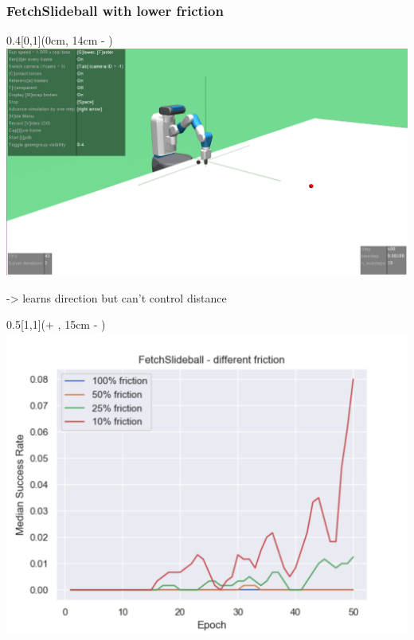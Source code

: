 






\begin{frame}
	\frametitle{FetchSlideball with lower friction}	
	\vspace{1cm}
	
	\begin{textblock*}{0.4\paperwidth}[0,1](0cm, 14cm - \PraesentationSeitenrand)%
		\includegraphics[width=0.4\paperwidth]{./Ressourcen/Figures/FetchSlideball-v2.pdf}
		
		-> learns direction but can't control distance 
	\end{textblock*}
	
	\begin{textblock*}{0.5\paperwidth}[1,1](\textwidth + \PraesentationSeitenrand, 15cm - \PraesentationSeitenrand)%
		\includegraphics[width=0.5\paperwidth]{./Ressourcen/Figures/fig_FetchSlideball_friction.pdf}
	\end{textblock*}
	

	

	
\end{frame}
\clearpage

